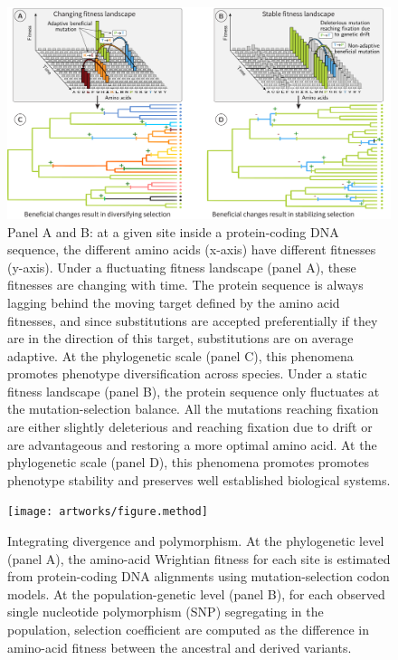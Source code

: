 \documentclass{article}
\begin{document}
    \begin{figure}[!ht]
        \centering
        \includegraphics[width=\textwidth, page=1] {artworks/figure.fitness-landscape}
        \caption{
            Panel A and B: at a given site inside a protein-coding DNA sequence, the different amino acids (x-axis) have different fitnesses (y-axis).
            Under a fluctuating fitness landscape (panel A), these fitnesses are changing with time.
            The protein sequence is always lagging behind the moving target defined by the amino acid fitnesses, and since substitutions are accepted preferentially if they are in the direction of this target, substitutions are on average adaptive.
            At the phylogenetic scale (panel C), this phenomena promotes phenotype diversification across species.
            Under a static fitness landscape (panel B), the protein sequence only fluctuates at the mutation-selection balance.
            All the mutations reaching fixation are either slightly deleterious and reaching fixation due to drift or are advantageous and restoring a more optimal amino acid.
            At the phylogenetic scale (panel D), this phenomena promotes promotes phenotype stability and preserves well established biological systems.
        }
        \label{fig:fitness-landscape}
    \end{figure}

    \begin{figure}[!ht]
        \centering
        \texttt{[image: artworks/figure.method]}
        \caption{
            Integrating divergence and polymorphism.
            At the phylogenetic level (panel A), the amino-acid Wrightian fitness for each site is estimated from protein-coding DNA alignments using mutation-selection codon models.
            At the population-genetic level (panel B), for each observed single nucleotide polymorphism (SNP) segregating in the population, selection coefficient are computed as the difference in amino-acid fitness between the ancestral and derived variants.
        }
        \label{fig:method}
    \end{figure}
\end{document}
